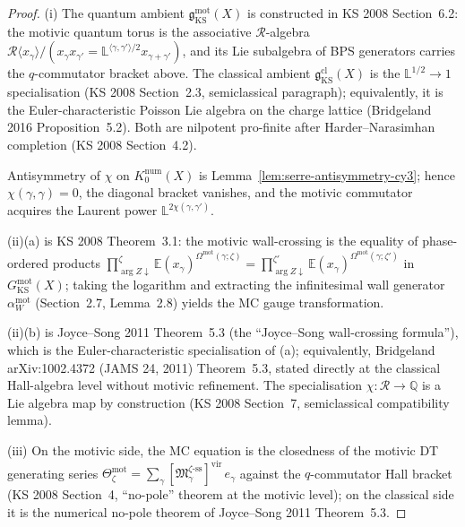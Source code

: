 \begin{proof}
(i) The quantum ambient
$\mathfrak{g}_{\mathrm{KS}}^{\mathrm{mot}}(X)$ is constructed in KS
2008 Section~6.2: the motivic quantum torus is the associative
$\mathcal{R}$-algebra
$\mathcal{R}\langle x_\gamma \rangle / (x_\gamma x_{\gamma'}
 = \mathbb{L}^{\langle\gamma,\gamma'\rangle/2}
 x_{\gamma+\gamma'})$,
and its Lie subalgebra of BPS generators carries the $q$-commutator
bracket above. The classical ambient
$\mathfrak{g}_{\mathrm{KS}}^{\mathrm{cl}}(X)$ is the
$\mathbb{L}^{1/2} \to 1$ specialisation (KS 2008 Section~2.3,
semiclassical paragraph); equivalently, it is the
Euler-characteristic Poisson Lie algebra on the charge lattice
(Bridgeland 2016 Proposition~5.2). Both are nilpotent pro-finite
after Harder--Narasimhan completion (KS 2008 Section~4.2).

Antisymmetry of $\chi$ on $K_0^{\mathrm{num}}(X)$ is
Lemma~\ref{lem:serre-antisymmetry-cy3}; hence $\chi(\gamma, \gamma) =
0$, the diagonal bracket vanishes, and the motivic commutator acquires
the Laurent power $\mathbb{L}^{2\chi(\gamma, \gamma')}$.

(ii)(a) is KS 2008 Theorem~3.1: the motivic wall-crossing is the
equality of phase-ordered products
$\prod_{\arg Z \downarrow}^{\zeta} \mathbb{E}(x_\gamma)^{\Omega^{\mathrm{mot}}(\gamma;\zeta)}
 = \prod_{\arg Z \downarrow}^{\zeta'} \mathbb{E}(x_\gamma)^{\Omega^{\mathrm{mot}}(\gamma;\zeta')}$
in $G_{\mathrm{KS}}^{\mathrm{mot}}(X)$; taking the logarithm and
extracting the infinitesimal wall generator $\alpha_W^{\mathrm{mot}}$
(Section~2.7, Lemma~2.8) yields the MC gauge transformation.

(ii)(b) is Joyce--Song 2011 Theorem~5.3 (the ``Joyce--Song
wall-crossing formula''), which is the Euler-characteristic
specialisation of (a); equivalently, Bridgeland
\textup{arXiv:1002.4372} (JAMS 24, 2011) Theorem~5.3, stated
directly at the classical Hall-algebra level without motivic
refinement. The
specialisation $\chi \colon \mathcal{R} \to \mathbb{Q}$ is a Lie
algebra map by construction (KS 2008 Section~7, semiclassical
compatibility lemma).

(iii) On the motivic side, the MC equation is the closedness of the
motivic DT generating series
$\Theta^{\mathrm{mot}}_\zeta = \sum_\gamma
 [\mathfrak{M}_\gamma^{\zeta\text{-ss}}]^{\mathrm{vir}}\, e_\gamma$
against the $q$-commutator Hall bracket (KS 2008 Section~4,
``no-pole'' theorem at the motivic level); on the classical side it
is the numerical no-pole theorem of Joyce--Song 2011 Theorem~5.3.


\end{proof}
